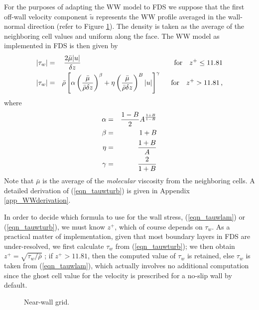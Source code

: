 For the purposes of adapting the WW model to FDS we suppose that the first off-wall velocity component $\tilde{u}$ represents the WW profile averaged in the wall-normal direction (refer to Figure \ref{fig_nearwall_grid}).  The density is taken as the average of the neighboring cell values and uniform along the face.  The WW model as implemented in FDS is then given by
\begin{eqnarray}
\label{eqn_tauwlam} |\tau_w| &=& \frac{2 \bar{\mu} |u|}{\delta z}  \hspace{4.70cm}\mbox{for} \quad z^+ \le 11.81 \vspace{0.2cm}\\
\label{eqn_tauwturb}|\tau_w| &=& \bar{\rho}\left[\alpha\left(\frac{\bar{\mu}}{\bar{\rho}\delta z}\right)^\beta + \eta\left(\frac{\bar{\mu}}{\bar{\rho}\delta z}\right)^B |u|\right]^\gamma  \hspace{0.50cm}\mbox{for} \quad z^+ > 11.81 \,\mbox{,}
\end{eqnarray}
where
\begin{eqnarray}
\alpha &=& \frac{1-B}{2} A^{\frac{1+B}{1-B}} \vspace{0.2cm}\\
\beta  &=& 1+B \vspace{0.2cm}\\
\eta   &=& \frac{1+B}{A} \vspace{0.2cm}\\
\gamma &=& \frac{2}{1+B}
\end{eqnarray}
Note that $\bar{\mu}$ is the average of the \emph{molecular} viscosity from the neighboring cells.  A detailed derivation of (\ref{eqn_tauwturb}) is given in Appendix \ref{app_WWderivation}.

In order to decide which formula to use for the wall stress, (\ref{eqn_tauwlam}) or (\ref{eqn_tauwturb}), we must know $z^+$, which of course depends on $\tau_w$.  As a practical matter of implementation, given that most boundary layers in FDS are under-resolved, we first calculate $\tau_w$ from (\ref{eqn_tauwturb}); we then obtain $z^+ = \sqrt{\tau_w/\bar{\rho}}$ ; if $z^+>11.81$, then the computed value of $\tau_w$ is retained, else $\tau_w$ is taken from (\ref{eqn_tauwlam}), which actually involves no additional computation since the ghost cell value for the velocity is prescribed for a no-slip wall by default.

\begin{figure}
   \begin{center}
      \caption{\label{fig_nearwall_grid} \small Near-wall grid.}
   \end{center}
\end{figure}

